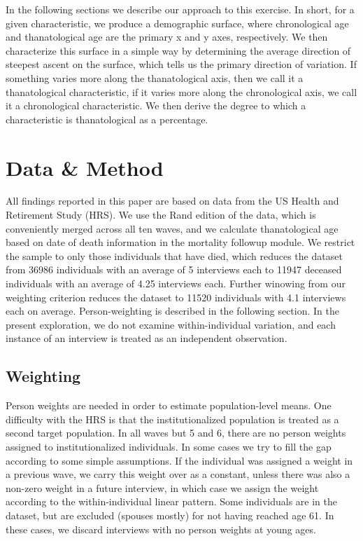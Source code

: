 \documentclass{article}
\begin{document}
In the following sections we describe our
approach to this exercise. In short, for a given characteristic, we produce a
demographic surface, where chronological age and thanatological age are the
primary x and y axes, respectively.
We then characterize this surface in a simple way by determining the average direction of steepest ascent on the surface,
which tells us the primary direction of variation. If something varies more along the thanatological axis, then we call it a thanatological characteristic, if it varies more along the chronological axis, we call it a chronological characteristic. We then derive the degree to which a characteristic is thanatological as a percentage.

\section*{Data \& Method}
All findings reported in this paper are based on data from the US Health and
Retirement Study (HRS). We use the Rand edition of the data, which is
conveniently merged across all ten waves, and we calculate thanatological age
based on date of death information in the mortality followup module. We
restrict the sample to only those individuals that have died, which reduces the
dataset from 36986 individuals with an average of 5 interviews each to 11947
deceased individuals with an average of 4.25 interviews each. Further winowing
from our weighting criterion reduces the dataset to
11520 individuals with 4.1 interviews each on average. Person-weighting is
described in the following section. In the present exploration, we do not examine
within-individual variation, and each instance of an interview is treated as an
independent observation.

\subsection{Weighting}
Person weights
are needed in order to estimate population-level means.
One difficulty with the HRS is that the institutionalized population is treated
as a second target population. In all waves but 5 and 6, there are no person weights
assigned to institutionalized individuals. In some cases we try to fill the gap according to some simple
assumptions. If the individual was assigned a weight in a previous wave, we
carry this weight over as a constant, unless there was also a non-zero weight in a future interview, in
which case we assign the weight according to the within-individual linear
pattern. Some individuals are in the dataset, but are
excluded (spouses mostly) for not having reached age 61. In these
cases, we discard interviews with no person weights at young ages. 
\end{document}
